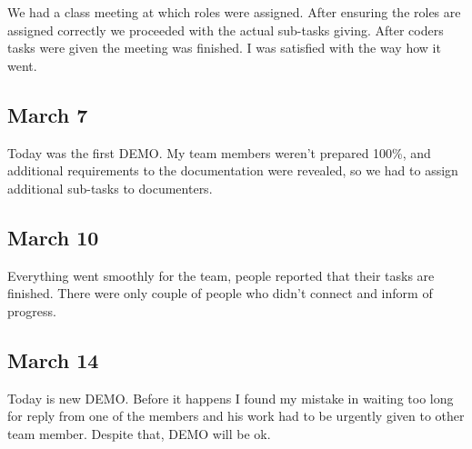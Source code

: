 \documentclass[11pt,letterpaper]{article}
\begin{document}
We had a class meeting at which roles were assigned. After ensuring the roles are assigned correctly we proceeded with the actual sub-tasks giving. After coders tasks were given the meeting was finished. I was satisfied with the way how it went.

\subsection*{March 7}

Today was the first DEMO. My team members weren't prepared 100\%, and additional requirements to the documentation were revealed, so we had to assign additional sub-tasks to documenters.

\subsection*{March 10}

Everything went smoothly for the team, people reported that their tasks are finished. There were only couple of people who didn't connect and inform of progress.

\subsection*{March 14}

Today is new DEMO. Before it happens I found my mistake in waiting too long for reply from one of the members and his work had to be urgently given to other team member. Despite that, DEMO will be ok.
\end{document}

